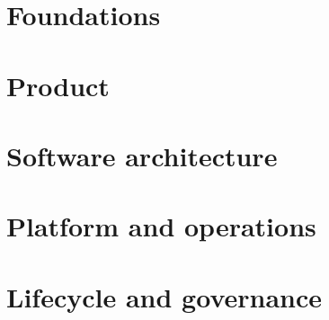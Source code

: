 \documentclass[11pt, a4paper, twoside=semi, open=any, headings=standardclasses,
  toc=listof, numbers=noenddot, parskip=false]{scrbook}
\begin{document}
\frontmatter


\tableofcontents
\listoffigures

\mainmatter

\part{Foundations}



\part{Product}



\part{Software architecture}




\part{Platform and operations}






\part{Lifecycle and governance}




\appendix



\end{document}
